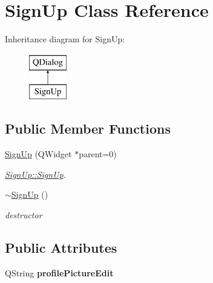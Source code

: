 \hypertarget{classSignUp}{\section{Sign\-Up Class Reference}
\label{classSignUp}
}
Inheritance diagram for Sign\-Up\-:\begin{figure}[H]
\begin{center}
\leavevmode
\includegraphics[height=2.000000cm]{classSignUp}
\end{center}
\end{figure}
\subsection*{Public Member Functions}
\begin{DoxyCompactItemize}
\item 
\hyperlink{classSignUp_a24c4f766e40f748e74f3c2d215c0c23c}{Sign\-Up} (Q\-Widget $\ast$parent=0)
\begin{DoxyCompactList}\small\item\em \hyperlink{classSignUp_a24c4f766e40f748e74f3c2d215c0c23c}{Sign\-Up\-::\-Sign\-Up}. \end{DoxyCompactList}\item 
\hypertarget{classSignUp_a361ad19f46cd8a70d0f661a841e3a63e}{\hyperlink{classSignUp_a361ad19f46cd8a70d0f661a841e3a63e}{$\sim$\-Sign\-Up} ()}\label{classSignUp_a361ad19f46cd8a70d0f661a841e3a63e}

\begin{DoxyCompactList}\small\item\em destructor \end{DoxyCompactList}\end{DoxyCompactItemize}
\subsection*{Public Attributes}
\begin{DoxyCompactItemize}
\item 
\hypertarget{classSignUp_a5f945a3243129bde03244b9861b1314c}{Q\-String {\bfseries profile\-Picture\-Edit}}\label{classSignUp_a5f945a3243129bde03244b9861b1314c}

\end{DoxyCompactItemize}


